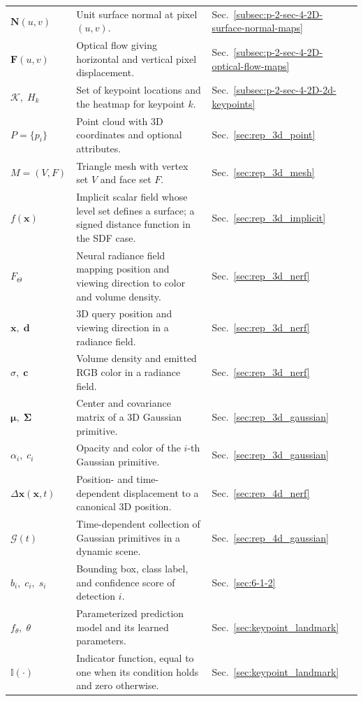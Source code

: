 \begin{longtable}{lll}
$\mathbf{N}(u,v)$ & Unit surface normal at pixel $(u,v)$. & Sec.~\ref{subsec:p-2-sec-4-2D-surface-normal-maps} \\
$\mathbf{F}(u,v)$ & Optical flow giving horizontal and vertical pixel displacement. & Sec.~\ref{subsec:p-2-sec-4-2D-optical-flow-maps} \\
$\mathcal{K},\;H_k$ & Set of keypoint locations and the heatmap for keypoint $k$. & Sec.~\ref{subsec:p-2-sec-4-2D-2d-keypoints} \\
$P=\{p_i\}$ & Point cloud with 3D coordinates and optional attributes. & Sec.~\ref{sec:rep_3d_point} \\
$M=(V,F)$ & Triangle mesh with vertex set $V$ and face set $F$. & Sec.~\ref{sec:rep_3d_mesh} \\
$f(\mathbf{x})$ & Implicit scalar field whose level set defines a surface; a signed distance function in the SDF case. & Sec.~\ref{sec:rep_3d_implicit} \\
$F_\Theta$ & Neural radiance field mapping position and viewing direction to color and volume density. & Sec.~\ref{sec:rep_3d_nerf} \\
$\mathbf{x},\;\mathbf{d}$ & 3D query position and viewing direction in a radiance field. & Sec.~\ref{sec:rep_3d_nerf} \\
$\sigma,\;\mathbf{c}$ & Volume density and emitted RGB color in a radiance field. & Sec.~\ref{sec:rep_3d_nerf} \\
$\boldsymbol{\mu},\;\boldsymbol{\Sigma}$ & Center and covariance matrix of a 3D Gaussian primitive. & Sec.~\ref{sec:rep_3d_gaussian} \\
$\alpha_i,\;c_i$ & Opacity and color of the $i$-th Gaussian primitive. & Sec.~\ref{sec:rep_3d_gaussian} \\
$\Delta\mathbf{x}(\mathbf{x},t)$ & Position- and time-dependent displacement to a canonical 3D position. & Sec.~\ref{sec:rep_4d_nerf} \\
$\mathcal{G}(t)$ & Time-dependent collection of Gaussian primitives in a dynamic scene. & Sec.~\ref{sec:rep_4d_gaussian} \\
$b_i,\;c_i,\;s_i$ & Bounding box, class label, and confidence score of detection $i$. & Sec.~\ref{sec:6-1-2} \\
$f_\theta,\;\theta$ & Parameterized prediction model and its learned parameters. & Sec.~\ref{sec:keypoint_landmark} \\
$\mathbb{I}(\cdot)$ & Indicator function, equal to one when its condition holds and zero otherwise. & Sec.~\ref{sec:keypoint_landmark} \\

\end{longtable}
